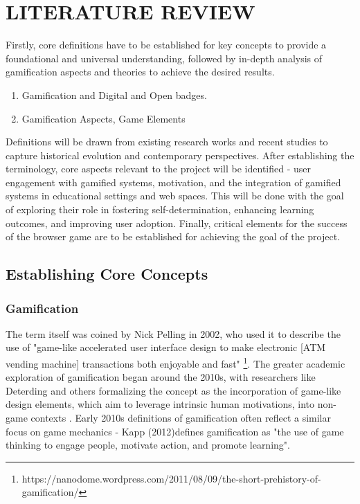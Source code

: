 \section{LITERATURE REVIEW}

Firstly, core definitions have to be established for key concepts to provide a foundational and universal understanding, followed by in-depth analysis of gamification  aspects and theories to achieve the desired results.

\begin{enumerate}
  \addtolength{\itemsep}{-0.5\baselineskip} 
  \item Gamification and Digital and Open badges.
  \item Gamification Aspects, Game Elements
\end{enumerate}

Definitions will be drawn from existing research works and recent studies to capture historical evolution and contemporary perspectives. 
After establishing the terminology, core aspects relevant to the project will be identified - user engagement with gamified systems, motivation, and the integration of gamified systems in educational settings and web spaces. 
This will be done with the goal of exploring their role in fostering self-determination, enhancing learning outcomes, and improving user adoption. 
Finally, critical elements for the success of the browser game are to be established for achieving the goal of the project.

%
\subsection{Establishing Core Concepts}

\subsubsection{Gamification}
%
The term itself was coined by Nick Pelling in 2002, who used it to describe the use of "game-like accelerated user interface design to make electronic [ATM vending machine] transactions both enjoyable and fast" \footnote{https://nanodome.wordpress.com/2011/08/09/the-short-prehistory-of-gamification/}. 
The greater academic exploration of gamification began around the 2010s, with researchers like Deterding and others formalizing the concept as the incorporation of game-like design elements, which aim to leverage intrinsic human motivations, into non-game contexts \cite{definition}.
Early 2010s definitions of gamification often reflect a similar focus on game mechanics - Kapp (2012)defines gamification as "the use of game thinking to engage people, motivate action, and promote learning"\cite{definition2}.

